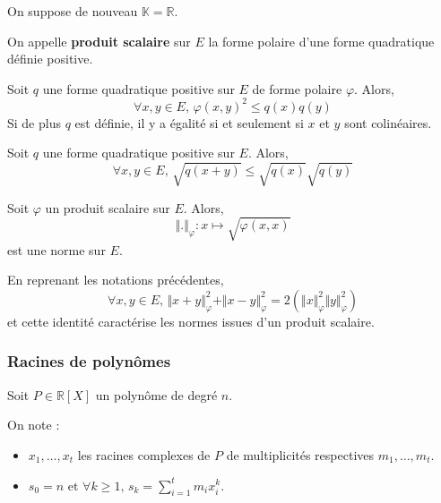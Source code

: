 	On suppose de nouveau $\mathbb{K} = \mathbb{R}$.


	\begin{definition}
		On appelle \textbf{produit scalaire} sur $E$ la forme polaire d'une forme quadratique définie positive.
	\end{definition}


	\begin{proposition}
		Soit $q$ une forme quadratique positive sur $E$ de forme polaire $\varphi$. Alors,
		\[ \forall x, y \in E, \, \varphi(x, y)^2 \leq q(x) q(y) \]
		Si de plus $q$ est définie, il y a égalité si et seulement si $x$ et $y$ sont colinéaires.
	\end{proposition}

	\begin{proposition}
		Soit $q$ une forme quadratique positive sur $E$. Alors,
		\[ \forall x, y \in E, \, \sqrt{q(x + y)} \leq \sqrt{q(x)} \sqrt{q(y)} \]
	\end{proposition}

	\begin{corollary}
		Soit $\varphi$ un produit scalaire sur $E$. Alors,
		\[ \Vert . \Vert_{\varphi} : x \mapsto \sqrt{\varphi(x, x)} \]
		est une norme sur $E$.
	\end{corollary}


	\begin{proposition}
		En reprenant les notations précédentes,
		\[ \forall x, y \in E, \, \Vert x + y \Vert_{\varphi}^2 + \Vert x - y \Vert_{\varphi}^2 = 2(\Vert x \Vert_{\varphi}^2 \Vert y \Vert_{\varphi}^2) \]
		et cette identité caractérise les normes issues d'un produit scalaire.
	\end{proposition}

	\subsubsection{Racines de polynômes}


	Soit $P \in \mathbb{R}[X]$ un polynôme de degré $n$.

	\begin{notation}
		On note :
		\begin{itemize}
			\item $x_1, \dots, x_t$ les racines complexes de $P$ de multiplicités respectives $m_1, \dots, m_t$.
			\item $s_0 = n \text{ et } \forall k \geq 1, \, s_k = \sum_{i=1}^t m_i x_i^k$.
		\end{itemize}
	\end{notation}

